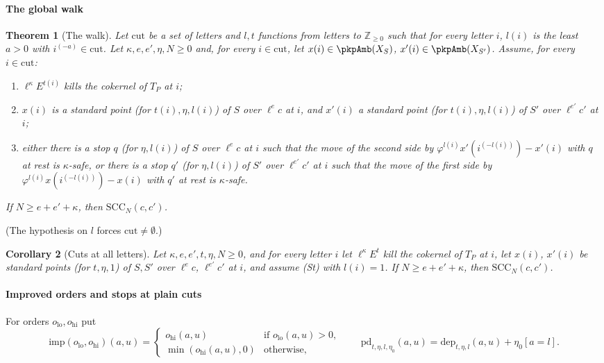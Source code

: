 \documentclass[10pt]{amsart}
\newtheorem{theorem}{Theorem}[section]
\newtheorem{corollary}[theorem]{Corollary}
\theoremstyle{definition}
\theoremstyle{remark}
\newcommand{\Z}{\mathbb Z}
\begin{document}
\paragraph*{The global walk}

\begin{theorem}[The walk]\label{pkm:walk}
Let $\mathrm{cut}$ be a set of letters and $l,t$ functions from letters to $\Z_{\ge0}$ such that for
every letter $i$, $l(i)$ is the least $a>0$ with $i^{(-a)}\in\mathrm{cut}$. Let $\kappa,e,e',\eta,N\ge0$
and, for every $i\in\mathrm{cut}$, let $x(i)\in\pkpAmb(X_S)$, $x'(i)\in\pkpAmb(X_{S'})$. Assume, for every
$i\in\mathrm{cut}$:
\begin{enumerate}
\item[(K)] $\ell^\kappa E^{t(i)}$ kills the cokernel of $T_P$ at $i$;
\item[(P)] $x(i)$ is a standard point (for $t(i),\eta,l(i)$) of $S$ over $\ell^ec$ at $i$, and $x'(i)$ a
standard point (for $t(i),\eta,l(i)$) of $S'$ over $\ell^{e'}c'$ at $i$;
\item[(St)] either there is a stop $q$ (for $\eta,l(i)$) of $S$ over $\ell^ec$ at $i$ such that the
move of the second side by $\varphi^{l(i)}x'(i^{(-l(i))})-x'(i)$ with $q$ at rest is $\kappa$-safe, or
there is a stop $q'$ (for $\eta,l(i)$) of $S'$ over $\ell^{e'}c'$ at $i$ such that the move of the
first side by $\varphi^{l(i)}x(i^{(-l(i))})-x(i)$ with $q'$ at rest is $\kappa$-safe.
\end{enumerate}
If $N\ge e+e'+\kappa$, then $\mathrm{SCC}_N(c,c')$.
\end{theorem}

(The hypothesis on $l$ forces $\mathrm{cut}\ne\emptyset$.)

\begin{corollary}[Cuts at all letters]\label{pkm:walk-all}
Let $\kappa,e,e',t,\eta,N\ge0$, and for every letter $i$ let $\ell^\kappa E^t$ kill the cokernel of
$T_P$ at $i$, let $x(i)$, $x'(i)$ be standard points (for $t,\eta,1$) of $S,S'$ over $\ell^ec$,
$\ell^{e'}c'$ at $i$, and assume (St) with $l(i)=1$. If $N\ge e+e'+\kappa$, then $\mathrm{SCC}_N(c,c')$.
\end{corollary}

\paragraph*{Improved orders and stops at plain cuts}

For orders $o_{\mathrm{lo}},o_{\mathrm{hi}}$ put
\[
\mathrm{imp}(o_{\mathrm{lo}},o_{\mathrm{hi}})(a,u)=\begin{cases}o_{\mathrm{hi}}(a,u)&\text{if }
o_{\mathrm{lo}}(a,u)>0,\\ \min(o_{\mathrm{hi}}(a,u),0)&\text{otherwise,}\end{cases}
\qquad
\mathrm{pd}_{t,\eta,l,\eta_0}(a,u)=\mathrm{dep}_{t,\eta,l}(a,u)+\eta_0[a=l].
\]
\end{document}
